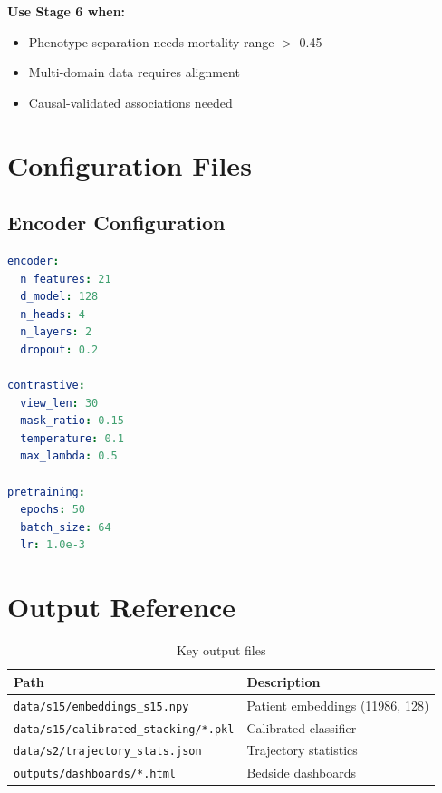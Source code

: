 \documentclass[11pt,a4paper]{article}
\renewcommand{\arraystretch}{1.3}
\newcommand{\filepath}[1]{\texttt{\color{accent}#1}}
\begin{document}
\begin{tipbox}
\textbf{Use Stage 6 when:}
\begin{itemize}[nosep,leftmargin=*]
    \item Phenotype separation needs mortality range $>$ 0.45
    \item Multi-domain data requires alignment
    \item Causal-validated associations needed
\end{itemize}
\end{tipbox}

\section{Configuration Files}

\subsection{Encoder Configuration}

\begin{lstlisting}[language=yaml,title={\faFileCodeO\hspace{0.5em}config/s15\_config.yaml}]
encoder:
  n_features: 21
  d_model: 128
  n_heads: 4
  n_layers: 2
  dropout: 0.2

contrastive:
  view_len: 30
  mask_ratio: 0.15
  temperature: 0.1
  max_lambda: 0.5

pretraining:
  epochs: 50
  batch_size: 64
  lr: 1.0e-3
\end{lstlisting}

\section{Output Reference}

\begin{table}[H]
\centering
\renewcommand{\arraystretch}{1.4}
\begin{tabular}{lp{7cm}}
\toprule
\textbf{Path} & \textbf{Description} \\
\midrule
\rowcolor{lightgray}
\filepath{data/s15/embeddings\_s15.npy} & Patient embeddings (11986, 128) \\
\filepath{data/s15/calibrated\_stacking/*.pkl} & Calibrated classifier \\
\rowcolor{lightgray}
\filepath{data/s2/trajectory\_stats.json} & Trajectory statistics \\
\filepath{outputs/dashboards/*.html} & Bedside dashboards \\
\bottomrule
\end{tabular}
\caption{Key output files}
\end{table}
\end{document}
